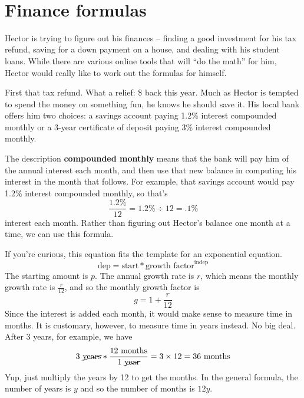  ~\vspace{.1in}
 
\section{Finance formulas}

Hector is trying to figure out his finances -- finding a good investment for his tax refund, saving for a down payment on a house, and dealing with his student loans.  While there are various online tools that will ``do the math'' for him, Hector would really like to work out the formulas for himself.

First that tax refund.  What a relief:  \$ back this year.  Much as Hector is tempted to spend the money on something fun, he knows he should save it.  His local bank offers him two choices:  a savings account paying 1.2\% interest compounded monthly or a 3-year certificate of deposit paying 3\% interest compounded monthly.  

The description \textbf{compounded monthly} means that the bank will pay him  of the annual interest each month, and then use that new balance in computing his interest in the month that follows.  For example, that savings account would pay 1.2\% interest compounded monthly, so  that's $$\frac{1.2\%}{12}= 1.2\% \div 12 = .1\%$$ interest each month.  Rather than figuring out Hector's balance one month at a time, we can use this formula.

 \bigskip
\bigskip

If you're curious, this equation fits the template for an exponential equation.  
$$\text{dep} = \text{start} \ast \text{growth factor} ^ {\text{indep}}$$
The starting amount is $p$.  The annual growth rate is $r$, which means the monthly growth rate is $\frac{r}{12}$, and so the monthly growth factor is 
$$g=1+\frac{r}{12}$$ 
Since the interest is added each month, it would make sense to measure time in months.  It is customary, however, to measure time in years instead.  No big deal.  After 3 years, for example, we have 
$$3 \text{ \cancel{years}} \ast \frac{12 \text{ months}}{1\text{ \cancel{year}}} = 3 \times 12 = 36 \text{ months}$$  
Yup, just multiply the years by 12 to get the months.  In the general formula, the number of years is $y$ and so the number of months is $12y$.

